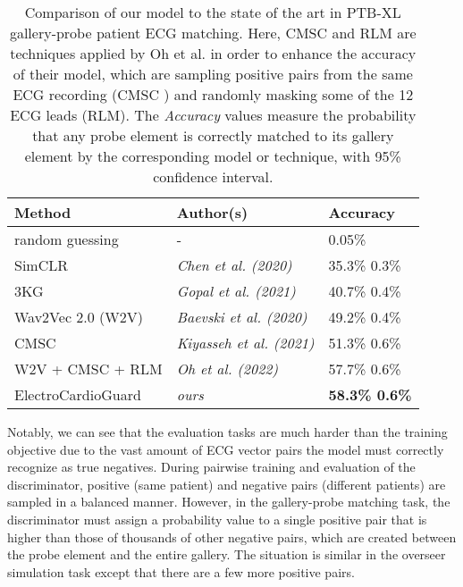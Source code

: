 \documentclass[preprint,12pt]{elsarticle}
\begin{document}
\begin{table}[h]
    \footnotesize
    \centering
    \begin{tabular}{lll}
        \toprule
        \textbf{Method} & \textbf{Author(s)} & \textbf{Accuracy} \\
        \midrule \midrule
        random guessing & - &  0.05\% \\
        \midrule 
        SimCLR & \textit{Chen et al. (2020)} \cite{chen2020simple} & 35.3\%  0.3\% \\
        3KG & \textit{Gopal et al. (2021)} \cite{gopal20213kg} & 40.7\%  0.4\% \\
        Wav2Vec 2.0 (W2V) & \textit{Baevski et al. (2020)} \cite{baevski2020wav2vec} & 49.2\%  0.4\% \\
        CMSC & \textit{Kiyasseh et al. (2021)} \cite{kiyasseh2021clocs} & 51.3\%  0.6\% \\
        W2V + CMSC + RLM & \textit{Oh et al. (2022)} \cite{oh2022lead} & 57.7\%  0.6\% \\
        \midrule
        ElectroCardioGuard & \textit{ours} & \textbf{58.3\%  0.6\%} \\
        \bottomrule
    \end{tabular}
    \caption{Comparison of our model to the state of the art in PTB-XL gallery-probe patient ECG matching. Here, CMSC and RLM are techniques applied by Oh et al. \cite{oh2022lead} in order to enhance the accuracy of their model, which are sampling positive pairs from the same ECG recording (CMSC \cite{kiyasseh2021clocs}) and randomly masking some of the 12 ECG leads (RLM). The \textit{Accuracy} values measure the probability that any probe element is correctly matched to its gallery element by the corresponding model or technique, with 95\% confidence interval.}
    \label{tab:gallery-probe-comparison}
\end{table}

Notably, we can see that the evaluation tasks are much harder than the training objective due to the vast amount of ECG vector pairs the model must correctly recognize as true negatives. During pairwise training and evaluation of the discriminator, positive (same patient) and negative pairs (different patients) are sampled in a balanced manner. However, in the gallery-probe matching task, the discriminator must assign a probability value to a single positive pair that is higher than those of thousands of other negative pairs, which are created between the probe element and the entire gallery. The situation is similar in the overseer simulation task except that there are a few more positive pairs.
\end{document}
